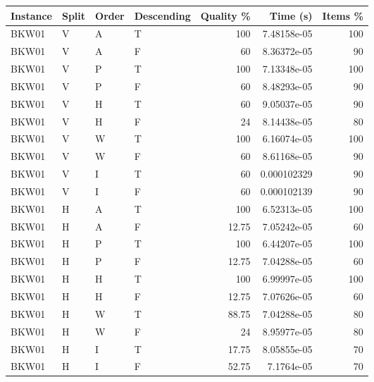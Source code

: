 \begin{tabular}{llllrrr}
    \hline
    Instance & Split & Order & Descending & Quality \% & Time (s)    & Items \% \\
    \hline
    BKW01    & V     & A     & T          & 100        & 7.48158e-05 & 100      \\
    BKW01    & V     & A     & F          & 60         & 8.36372e-05 & 90       \\
    BKW01    & V     & P     & T          & 100        & 7.13348e-05 & 100      \\
    BKW01    & V     & P     & F          & 60         & 8.48293e-05 & 90       \\
    BKW01    & V     & H     & T          & 60         & 9.05037e-05 & 90       \\
    BKW01    & V     & H     & F          & 24         & 8.14438e-05 & 80       \\
    BKW01    & V     & W     & T          & 100        & 6.16074e-05 & 100      \\
    BKW01    & V     & W     & F          & 60         & 8.61168e-05 & 90       \\
    BKW01    & V     & I     & T          & 60         & 0.000102329 & 90       \\
    BKW01    & V     & I     & F          & 60         & 0.000102139 & 90       \\
    BKW01    & H     & A     & T          & 100        & 6.52313e-05 & 100      \\
    BKW01    & H     & A     & F          & 12.75      & 7.05242e-05 & 60       \\
    BKW01    & H     & P     & T          & 100        & 6.44207e-05 & 100      \\
    BKW01    & H     & P     & F          & 12.75      & 7.04288e-05 & 60       \\
    BKW01    & H     & H     & T          & 100        & 6.99997e-05 & 100      \\
    BKW01    & H     & H     & F          & 12.75      & 7.07626e-05 & 60       \\
    BKW01    & H     & W     & T          & 88.75      & 7.04288e-05 & 80       \\
    BKW01    & H     & W     & F          & 24         & 8.95977e-05 & 80       \\
    BKW01    & H     & I     & T          & 17.75      & 8.05855e-05 & 70       \\
    BKW01    & H     & I     & F          & 52.75      & 7.1764e-05  & 70       \\

\end{tabular}
